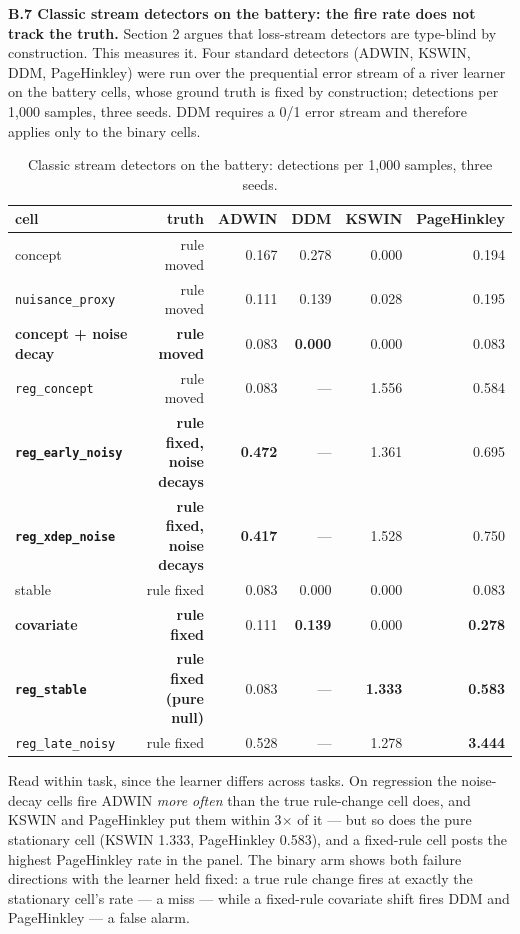 \documentclass[10pt]{article} %
\begin{document}
\textbf{B.7 Classic stream detectors on the battery: the fire rate does not track the truth.} Section 2
argues that loss-stream detectors are type-blind by construction. This measures it. Four standard
detectors (ADWIN, KSWIN, DDM, PageHinkley) were run over the prequential error stream of a river
learner on the battery cells, whose ground truth is fixed by construction; detections per 1,000
samples, three seeds. DDM requires a 0/1 error stream and therefore applies only to the binary
cells.

\begin{table}[t]
\centering
\small
\caption{Classic stream detectors on the battery: detections per 1,000 samples, three seeds.}
\label{tab:b7}
\begin{tabular}{@{}lrrrrr@{}}
\toprule
cell & truth & ADWIN & DDM & KSWIN & PageHinkley \\
\midrule
concept & rule moved & 0.167 & 0.278 & 0.000 & 0.194 \\
\texttt{nuisance\_proxy} & rule moved & 0.111 & 0.139 & 0.028 & 0.195 \\
\textbf{concept + noise decay} & \textbf{rule moved} & 0.083 & \textbf{0.000} & 0.000 & 0.083 \\
\texttt{reg\_concept} & rule moved & 0.083 & --- & 1.556 & 0.584 \\
\textbf{\texttt{reg\_early\_noisy}} & \textbf{rule fixed, noise decays} & \textbf{0.472} & --- & 1.361 & 0.695 \\
\textbf{\texttt{reg\_xdep\_noise}} & \textbf{rule fixed, noise decays} & \textbf{0.417} & --- & 1.528 & 0.750 \\
stable & rule fixed & 0.083 & 0.000 & 0.000 & 0.083 \\
\textbf{covariate} & \textbf{rule fixed} & 0.111 & \textbf{0.139} & 0.000 & \textbf{0.278} \\
\textbf{\texttt{reg\_stable}} & \textbf{rule fixed (pure null)} & 0.083 & --- & \textbf{1.333} & \textbf{0.583} \\
\texttt{reg\_late\_noisy} & rule fixed & 0.528 & --- & 1.278 & \textbf{3.444} \\
\bottomrule
\end{tabular}
\end{table}

Read within task, since the learner differs across tasks. On regression the noise-decay cells fire
ADWIN \emph{more often} than the true rule-change cell does, and KSWIN and PageHinkley put them within
3$\times$ of it --- but so does the pure stationary cell (KSWIN 1.333, PageHinkley 0.583), and a fixed-rule
cell posts the highest PageHinkley rate in the panel. The binary arm shows both failure directions
with the learner held fixed: a true rule change fires at exactly the stationary cell's rate --- a miss
--- while a fixed-rule covariate shift fires DDM and PageHinkley --- a false alarm.
\end{document}
